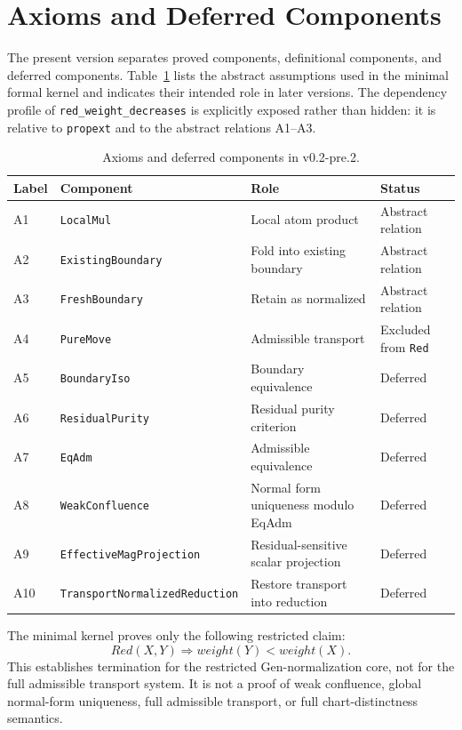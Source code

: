\documentclass[11pt]{article}
\begin{document}


\section{Axioms and Deferred Components}

The present version separates proved components, definitional components, and deferred components. Table~\ref{tab:axioms} lists the abstract assumptions used in the minimal formal kernel and indicates their intended role in later versions. The dependency profile of \texttt{red\_weight\_decreases} is explicitly exposed rather than hidden: it is relative to \texttt{propext} and to the abstract relations A1--A3.

\begin{table}[h]
\centering
\small
\begin{tabular}{llll}
\toprule
Label & Component & Role & Status \\
\midrule
A1 & \texttt{LocalMul} & Local atom product & Abstract relation \\
A2 & \texttt{ExistingBoundary} & Fold into existing boundary & Abstract relation \\
A3 & \texttt{FreshBoundary} & Retain as normalized & Abstract relation \\
A4 & \texttt{PureMove} & Admissible transport & Excluded from \texttt{Red} \\
A5 & \texttt{BoundaryIso} & Boundary equivalence & Deferred \\
A6 & \texttt{ResidualPurity} & Residual purity criterion & Deferred \\
A7 & \texttt{EqAdm} & Admissible equivalence & Deferred \\
A8 & \texttt{WeakConfluence} & Normal form uniqueness modulo EqAdm & Deferred \\
A9 & \texttt{EffectiveMagProjection} & Residual-sensitive scalar projection & Deferred \\
A10 & \texttt{TransportNormalizedReduction} & Restore transport into reduction & Deferred \\
\bottomrule
\end{tabular}
\caption{Axioms and deferred components in v0.2-pre.2.}
\label{tab:axioms}
\end{table}

The minimal kernel proves only the following restricted claim:
\[
Red(X,Y)\Rightarrow weight(Y)<weight(X).
\]
This establishes termination for the restricted Gen-normalization core, not for the full admissible transport system. It is not a proof of weak confluence, global normal-form uniqueness, full admissible transport, or full chart-distinctness semantics.
\end{document}
